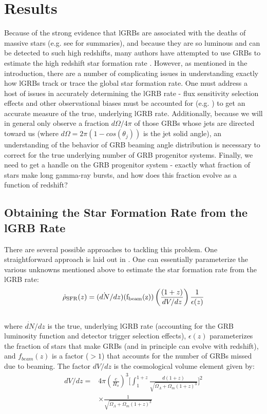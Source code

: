 \documentclass[fleqn,usenatbib,useAMS]{mnras}
\begin{document}
  

 \section{Results}
   Because of the strong evidence that lGRBs are associated with the deaths of massive stars (e.g. see \cite{WB06, HB12} for summaries), and because they are so luminous and can be detected to such high redshifts, many authors have attempted to use GRBs to estimate the high redshift star formation rate \citep{LRFRR02,Kist08,Yuk08,Kist09,WP10,RE12, TPT13, Lien14, PKK15, Kin19}.  However, as mentioned in the introduction, there are a number of complicating issues in understanding exactly how lGRBs track or trace the global star formation rate. One must address a host of issues in accurately determining the lGRB rate - flux sensitivity selection effects and other observational biases must be accounted for (e.g. \cite{LRFRR02, PKK15, LR19}) to get an accurate measure of the true, underlying lGRB rate.   Additionally, because we will in general only observe a fraction $d\Omega/4\pi$ of those GRBs whose jets are directed toward us (where $d\Omega = 2 \pi (1-cos(\theta_{j}))$ is the jet solid angle), an understanding of the behavior of GRB beaming angle distribution is necessary to correct for the true underlying number of GRB progenitor systems.  Finally, we need to get a handle on the GRB progenitor system - exactly what fraction of stars make long gamma-ray bursts, and how does this fraction evolve as a function of redshift?
   
  \subsection{Obtaining the Star Formation Rate from the lGRB Rate} 
   There are several possible approaches to tackling this problem.  One straightforward approach is laid out in \cite{Kist08,Yuk08,Kist09}.  One can essentially parameterize the various unknowns mentioned above to estimate the star formation rate from the lGRB rate:
 { \large 
  \begin{equation}
     \dot{\rho}_{\rm SFR}(z) = (\dot{dN}/dz)({\rm f_{beam}(z)})  \left(\frac{(1+z)}{dV/dz} \right) \frac{1}{\epsilon(z)}
  \end{equation}  } \\
 
 \noindent where $\dot{dN}/dz$ is the true, underlying lGRB rate (accounting for the GRB luminosity function and detector trigger selection effects), $\epsilon(z)$ parameterizes the fraction of stars that make GRBs (and in principle can evolve with redshift), and $f_{beam}(z)$ is a factor ($>1$) that accounts for the number of GRBs missed due to beaming.  The factor $dV/dz$ is the cosmological volume element given by:
 \begin{equation}
\begin{split}
    dV/dz = & 4 \pi (\frac{c}{H_{o}})^{3} \bigg[\int_{1}^{1+z} \frac{d(1+z)}{\sqrt{\Omega_{\Lambda} + \Omega_{m}(1+z)^{3}}}\bigg]^{2} \\
    & \times \frac{1}{\sqrt{\Omega_{\Lambda} + \Omega_{m}(1+z)^{3}}}
\end{split}
\end{equation}
\end{document}
